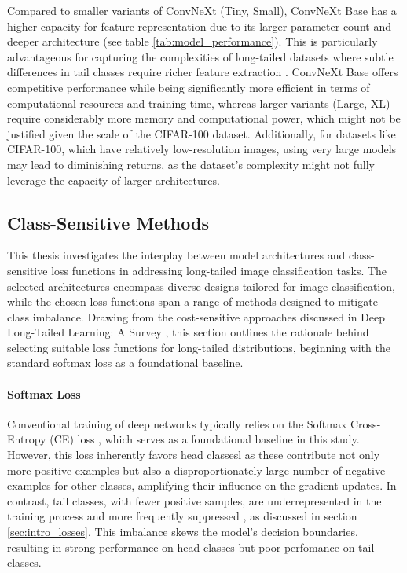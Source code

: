 Compared to smaller variants of ConvNeXt (Tiny, Small), ConvNeXt Base has a higher capacity for feature representation due to its larger parameter count and deeper architecture (see table \ref{tab:model_performance}). This is particularly advantageous for capturing the complexities of long-tailed datasets where subtle differences in tail classes require richer feature extraction \cite{liu2022convnet2020s}. ConvNeXt Base offers competitive performance while being significantly more efficient in terms of computational resources and training time, whereas larger variants (Large, XL) require considerably more memory and computational power, which might not be justified given the scale of the CIFAR-100 dataset. Additionally, for datasets like CIFAR-100, which have relatively low-resolution images, using very large models may lead to diminishing returns, as the dataset's complexity might not fully leverage the capacity of larger architectures.


\subsection{Class-Sensitive Methods}
\label{sec:loss_selection}
This thesis investigates the interplay between model architectures and class-sensitive loss functions in addressing long-tailed image classification tasks. The selected architectures encompass diverse designs tailored for image classification, while the chosen loss functions span a range of methods designed to mitigate class imbalance. Drawing from the cost-sensitive approaches discussed in Deep Long-Tailed Learning: A Survey \cite{zhang2023deep}, this section outlines the rationale behind selecting suitable loss functions for long-tailed distributions, beginning with the standard softmax loss as a foundational baseline.

\paragraph{Softmax Loss}

Conventional training of deep networks typically relies on the Softmax Cross-Entropy (CE) loss \cite{zhang2023deep}, which serves as a foundational baseline in this study. However, this loss inherently favors head classesl as these contribute not only more positive examples but also a disproportionately large number of negative examples for other classes, amplifying their influence on the gradient updates. In contrast, tail classes, with fewer positive samples, are underrepresented in the training process and more frequently suppressed \cite{zhang2023deep, lin2018focallossdenseobject}, as discussed in section \ref{sec:intro_losses}. This imbalance skews the model's decision boundaries, resulting in strong performance on head classes but poor perfomance on tail classes.

